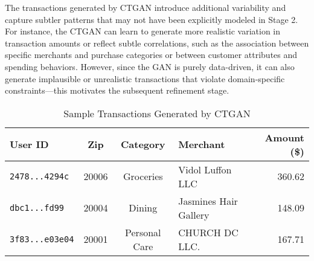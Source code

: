 \documentclass[conference]{IEEEtran}
\begin{document}
The transactions generated by CTGAN introduce additional variability and capture subtler patterns that may not have been explicitly modeled in Stage 2. For instance, the CTGAN can learn to generate more realistic variation in transaction amounts or reflect subtle correlations, such as the association between specific merchants and purchase categories or between customer attributes and spending behaviors. However, since the GAN is purely data-driven, it can also generate implausible or unrealistic transactions that violate domain-specific constraints—this motivates the subsequent refinement stage.


\begin{table}[H]
\centering
\small
\renewcommand{\arraystretch}{1.3}
\caption{Sample Customers Generated by GAN}
\label{tab:gan_customers}
\end{table}




\begin{table*}[htbp]
\centering
\small
\renewcommand{\arraystretch}{1.3}
\caption{Sample Transactions Generated by CTGAN}
\label{tab:ctgan_transactions}
\begin{tabular}{|l|c|c|l|r|}
\hline
\textbf{User ID} & \textbf{Zip} & \textbf{Category} & \textbf{Merchant} & \textbf{Amount (\$)} \\
\hline
\texttt{2478...4294c}   & 20006 & Groceries     & Vidol Luffon LLC     & 360.62 \\
\hline
\texttt{dbc1...fd99}    & 20004 & Dining        & Jasmines Hair Gallery & 148.09 \\
\hline
\texttt{3f83...e03e04}  & 20001 & Personal Care & CHURCH DC LLC.        & 167.71 \\
\hline
\end{tabular}
\end{table*}
\end{document}
